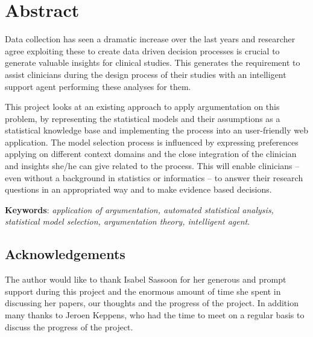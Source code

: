\section*{Abstract}

Data collection has seen a dramatic increase over the last years and researcher agree exploiting these to create data driven decision processes is crucial to generate valuable insights for clinical studies. This generates the requirement to assist clinicians during the design process of their studies with an intelligent support agent performing these analyses for them. 

This project looks at an existing approach to apply argumentation on this problem, by representing the statistical models and their assumptions as a statistical knowledge base and implementing the process into an user-friendly web application. The model selection process is influenced by expressing preferences applying on different context domains and the close integration of the clinician and insights she/he can give related to the process. This will enable clinicians -- even without a background in statistics or informatics -- to answer their research questions in an appropriated way and to make evidence based decisions. 

\bigskip
\bigskip

\textbf{Keywords}: \textit{application of argumentation, automated statistical analysis, statistical model selection, argumentation theory, intelligent agent}.

\bigskip
\bigskip

\subsection*{Acknowledgements}
The author would like to thank Isabel Sassoon for her generous and prompt support during this project and the enormous amount of time she spent in discussing her papers, our thoughts and the progress of the project. In addition many thanks to Jeroen Keppens, who had the time to meet on a regular basis to discuss the progress of the project.
